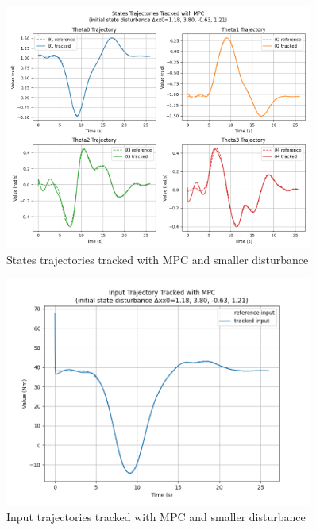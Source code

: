 \documentclass[a4paper,11pt,oneside]{book}
\begin{document}
\begin{figure}[H]
    \centering
    \includegraphics[width=0.9\textwidth]{State_traj_MPC_dist1_T4.png}
    \caption{States trajectories tracked with MPC and smaller disturbance}
    \label{fig:enter-label}
\end{figure}
\begin{figure}[H]
    \centering
    \includegraphics[width=0.9\textwidth]{input_traj_MPC__dist1_T4.png}
    \caption{Input trajectories tracked with MPC and smaller disturbance}
    \label{fig:enter-label}
\end{figure}
\end{document}

